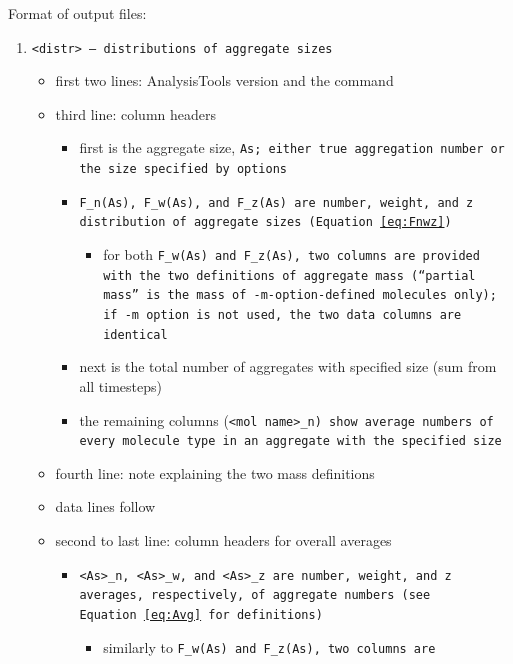 \noindent
Format of output files:
\begin{enumerate}[nosep,leftmargin=20pt]
  \item \tt{<distr>} -- distributions of aggregate sizes
    \begin{itemize}[nosep,leftmargin=5pt]
      \item first two lines: AnalysisTools version and the command
      \item third line: column headers
        \begin{itemize}[nosep,leftmargin=10pt]
          \item first is the aggregate size, \tt{As}; either true aggregation
            number or the size specified by options
          \item \tt{F_n(As)}, \tt{F_w(As)}, and \tt{F_z(As)} are
            number, weight, and z distribution of aggregate sizes (Equation
            \eqref{eq:Fnwz})
            \begin{itemize}
              \item for both \tt{F_w(As)} and \tt{F_z(As)}, two columns are
                provided with the two definitions of aggregate mass
                (\enquote{partial mass} is the mass of \tt{-m}-option-defined
                molecules only); if \tt{-m} option is not used, the two data
                columns are identical
            \end{itemize}
          \item next is the total number of aggregates with specified size (sum
            from all timesteps)
          \item the remaining columns (\tt{<mol name>_n}) show average
            numbers of every mole\-cule type in an aggregate with the specified
            size
        \end{itemize}
      \item fourth line: note explaining the two mass definitions
      \item data lines follow
      \item second to last line: column headers for overall averages
        \begin{itemize}[nosep,leftmargin=10pt]
          \item \tt{<As>_n}, \tt{<As>_w}, and \tt{<As>_z} are
            number, weight, and z averages, respectively, of aggregate
            numbers (see Equation~\eqref{eq:Avg} for definitions)
            \begin{itemize}
              \item similarly to \tt{F_w(As)} and \tt{F_z(As)}, two columns are

\end{itemize}
\end{itemize}
\end{itemize}
\end{enumerate}
